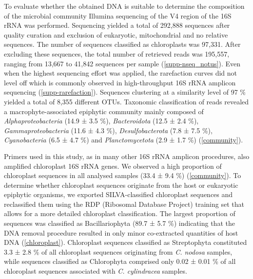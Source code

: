 \documentclass[12pt,]{article}
\begin{document}
To evaluate whether the obtained DNA is suitable to determine the
composition of the microbial community Illumina sequencing of the V4
region of the 16S rRNA was performed. Sequencing yielded a total of
292,888 sequences after quality curation and exclusion of eukaryotic,
mitochondrial and no relative sequences. The number of sequences
classified as chloroplasts was 97,331. After excluding these sequences,
the total number of retrieved reads was 195,557, ranging from 13,667 to
41,842 sequences per sample (\autoref{supp-nseq_notus}). Even when the
highest sequencing effort was applied, the rarefaction curves did not
level off which is commonly observed in high-throughput 16S rRNA
amplicon sequencing (\autoref{supp-rarefaction}). Sequences clustering
at a similarity level of 97 \si{\percent} yielded a total of 8,355
different OTUs. Taxonomic classification of reads revealed a
macrophyte-associated epiphytic community mainly composed of
\emph{Alphaproteobacteria} (14.9 ± 3.5 \si{\percent}),
\emph{Bacteroidota} (12.5 ± 2.4 \si{\percent}),
\emph{Gammaproteobacteria} (11.6 ± 4.3 \si{\percent}),
\emph{Desulfobacterota} (7.8 ± 7.5 \si{\percent}), \emph{Cyanobacteria}
(6.5 ± 4.7 \si{\percent}) and \emph{Planctomycetota} (2.9 ± 1.7
\si{\percent}) (\autoref{community}).

Primers used in this study, as in many other 16S rRNA amplicon
procedures, also amplified chloroplast 16S rRNA genes. We observed a
high proportion of chloroplast sequences in all analysed samples (33.4 ±
9.4 \si{\percent}) (\autoref{community}). To determine whether
chloroplast sequences originate from the host or eukaryotic epiphytic
organisms, we exported SILVA-classified chloroplast sequences and
reclassified them using the RDP (Ribosomal Database Project) training
set that allows for a more detailed chloroplast classification. The
largest proportion of sequences was classified as Bacillariophyta (89.7
± 5.7 \si{\percent}) indicating that the DNA removal procedure resulted
in only minor co-extracted quantities of host DNA
(\autoref{chloroplast}). Chloroplast sequences classified as
Streptophyta constituted 3.3 ± 2.8 \si{\percent} of all chloroplast
sequences originating from \emph{C. nodosa} samples, while sequences
classified as Chlorophyta comprised only 0.02 ± 0.01 \si{\percent} of
all chloroplast sequences associated with \emph{C. cylindracea} samples.
\end{document}
